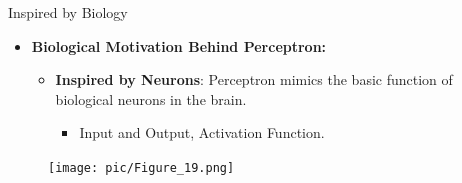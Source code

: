 \documentclass[serif, aspectratio=169]{beamer}
\begin{document}
\begin{frame}{Inspired by Biology}
    \begin{itemize}
        \item \textbf{Biological Motivation Behind Perceptron:}
        \medskip
        \begin{itemize}\itemsep1em
            \item \justifying \textbf{Inspired by Neurons}:
            Perceptron mimics the basic function of biological neurons in the brain.
            \begin{itemize}
                \item \justifying Input and Output, Activation Function.
            \end{itemize}
        \end{itemize}
    \end{itemize}
    \begin{figure}
        \centering
        \texttt{[image: pic/Figure\_19.png]}
    \end{figure}
    \vfill
\end{frame}
\end{document}
